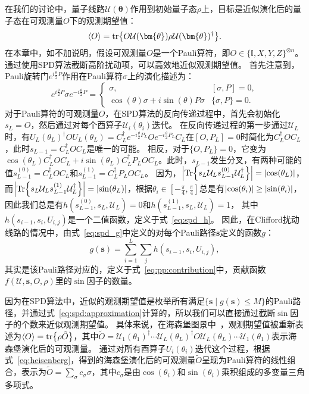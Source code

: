 在我们的讨论中，量子线路$\mathcal{U}(\bm{\theta})$作用到初始量子态$\rho$上，目标是近似演化后的量子态在可观测量$O$下的观测期望值：
\begin{equation}
    \langle O \rangle = \tr{O \mathcal{U}(\bm{\theta})\rho \mathcal{U}(\bm{\theta})^\dagger}.
\end{equation}
在本章中，如不加说明，假设可观测量$O$是一个Pauli算符，即$O\in \{\mathbb{I},X,Y,Z\}^{\otimes n}$。
通过使用SPD算法截断高阶扰动项，可以高效地近似观测期望值。
首先注意到，Pauli旋转门$e^{i\frac{\theta}{2} P}$作用在Pauli算符$\sigma$上的演化描述为：
\begin{equation}\label{eq:heisenberg}
  e^{i \frac{\theta}{2} P} \sigma e^{-i \frac{\theta}{2} P} = 
  \begin{cases}
  \sigma, & [\sigma,P] = 0, \\
  \cos(\theta) \sigma + i \sin(\theta) P\sigma & \{\sigma, P\} = 0.
  \end{cases} 
\end{equation}
对于Pauli算符的可观测量$O$，在SPD算法的反向传递过程中，首先会初始化$s_L=O$，然后通过对每个酉算子$\mathcal{U}_i(\theta_i)$迭代。
在反向传递过程的第一步通过$\mathcal{U}_L$时，有${U}_L(\theta_L)^{\dagger} O {U}_L(\theta_L)=C^\dagger_Le^{-i\frac{\theta}{2} P_L}Oe^{-i\frac{\theta}{2} P_L}C_L$在$[O,P_L]=0$时简化为$C_L^\dagger O C_L$，此时$s_{L-1}=C_L^\dagger O C_L$是唯一的可能。
相反，对于$\{O,P_L\} = 0$，它变为$\cos(\theta_L)C_L^\dagger O C_L + i\sin(\theta_L) C_L^\dagger P_L O C_L$。此时，$s_{L-1}$发生分叉，有两种可能的值$s_{L-1}^{(0)}=C_L^\dagger O C_L$和$s_{L-1}^{(1)}=C_L^\dagger P_L O C_L$。
因为，$\abs{\Tr{s_L \mathcal{U}_{L} s_{L-1}^{(0)} \mathcal{U}_{L}^\dagger}}=\abs{\cos(\theta_L)}$，而$\abs{\Tr{s_L \mathcal{U}_{L} s_{L-1}^{(1)} \mathcal{U}_{L}^\dagger}}=\abs{\sin(\theta_L)}$，根据$\theta_i\in [-\frac{\pi}{4},\frac{\pi}{4}]$总是有$\abs{\cos(\theta_i)}\geq \abs{\sin(\theta_i)}$，因此我们总是有$h(s_{L-1}^{(0)},s_L,\mathcal{U}_{L})=0$和$h(s_{L-1}^{(1)},s_L,\mathcal{U}_{L})=1$，
其中$h(s_{i-1},s_i,U_{i,j})$是一个二值函数，定义于式~\eqref{eq:spd_h}。
因此，在Clifford扰动线路的情况中，由式~\eqref{eq:spd_g}中定义的对每个Pauli路径$\bm{s}$定义的函数$g$：
\begin{equation}
    g(\bm{s})=\sum_{i=1}^{L}\sum_{j} h(s_{i-1},s_i,U_{i,j}),
\end{equation}
其实是该Pauli路径对应的，定义于式~\eqref{eq:pp:contribution}中，贡献函数$f(\mathcal{U},\bm{s},O,\rho)$里的$\sin$因子的数量。

因为在SPD算法中，近似的观测期望值是枚举所有满足$\{\bm{s}\mid g(\bm{s})\leq M\}$的Pauli路径，并通过式~\eqref{eq:spd:approximation}计算的，所以我们可以直接通过截断$\sin$因子的个数来近似观测期望值。
具体来说，在海森堡图景中~\cite{zhang2024clifford}，观测期望值被重新表述为$\langle O \rangle = \tr{\rho \tilde{O}}$，其中$\tilde{O} = \mathcal{U}_1(\theta_1)^{\dagger} \cdots  \mathcal{U}_L(\theta_L)^{\dagger} O \mathcal{U}_L(\theta_L)  \cdots \mathcal{U}_1(\theta_1)$表示海森堡演化后的可观测量。
通过对所有酉算子$U_i(\theta_i)$迭代这个过程，根据式~\eqref{eq:heisenberg}，得到的海森堡演化后的可观测量$\tilde{O}$呈现为Pauli算符的线性组合，表示为$\tilde{O} = \sum_\sigma c_\sigma \sigma$，其中$c_\sigma$是由$\cos(\theta_i)$和$\sin(\theta_i)$乘积组成的多变量三角多项式。

